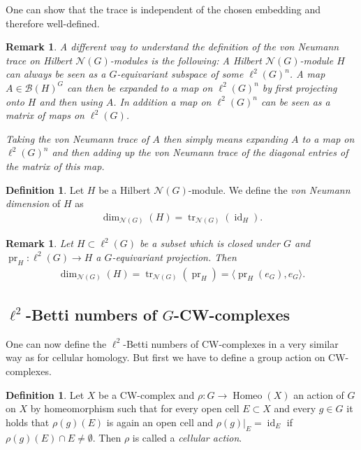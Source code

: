 \documentclass[12pt,a4paper]{scrartcl}
\theoremstyle{plain}
\newtheorem{Remark}[Theorem]{Remark}
\theoremstyle{definition}
\newtheorem{Definition}[Theorem]{Definition}
\numberwithin{equation}{section}
\newcommand{\2}{\mathbb{Z} / 2 \mathbb{Z}}
\newcommand{\1}{\bar{1}}
\newcommand{\0}{\bar{0}}
\newcommand{\tr}{\operatorname{tr}}
\newcommand{\pr}{\operatorname{pr}}
\newcommand{\Homeo}{\operatorname{Homeo}}
\newcommand{\id}{\operatorname{id}}
\begin{document}
One can show that the trace is independent of the chosen embedding and therefore well-defined.
\begin{Remark}
	A different way to understand the definition of the von Neumann trace on Hilbert $\mathcal{N}(G)$-modules is the following:
	A Hilbert $\mathcal{N}(G)$-module $H$ can always be seen as a $G$-equivariant subspace of some $\ell^2(G)^n$. A map $A \in \mathcal{B}(H)^G$ can then be expanded to a map on $\ell^2(G)^n$ by first projecting onto $H$ and then using $A$. In addition a map on $\ell^2(G)^n$ can be seen as a matrix of maps on $\ell^2(G)$.
	
	Taking the von Neumann trace of $A$ then simply means expanding $A$ to a map on $\ell^2(G)^n$ and then adding up the von Neumann trace of the diagonal entries of the matrix of this map.
\end{Remark}
\begin{Definition}\label{vNd}
	Let $H$ be a Hilbert $\mathcal{N}(G)$-module. We define the \emph{von Neumann dimension} of $H$ as
	\begin{align*}
		\dim_{\mathcal{N}(G)}(H) = \tr_{\mathcal{N}(G)}(\id_H).
	\end{align*}
\end{Definition}
\begin{Remark}\label{vNd_for_subsets}
	Let $H \subset \ell^2(G)$ be a subset which is closed under $G$ and $\pr_H\colon\ell^2(G) \to H$ a $G$-equivariant projection. Then\begin{align*}
	\dim_{\mathcal{N}(G)}(H) = \tr_{\mathcal{N}(G)}(\pr_H) = \langle \pr_H (e_G), e_G \rangle.
	\end{align*}
\end{Remark}

\subsection{$\ell^2$-Betti numbers of $G$-CW-complexes}
One can now define the $\ell^2$-Betti numbers of CW-complexes in a very similar way as for cellular homology. But first we have to define a group action on CW-complexes.
\begin{Definition}
	Let $X$ be a CW-complex and $\rho\colon G \to \Homeo(X)$ an action of $G$ on $X$ by homeomorphism such that for every open cell $E \subset X$ and every $g \in G$ it holds that $\rho(g)(E)$ is again an open cell and $\rho(g)|_{E} = \id_E$ if $\rho(g)(E) \cap E \neq \emptyset$. Then $\rho$ is called a \emph{cellular action}.
\end{Definition}
\end{document}
